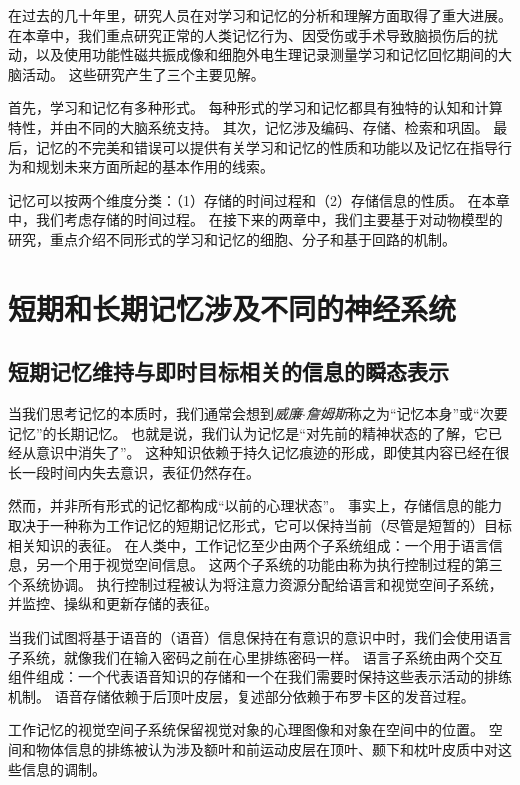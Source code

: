 在过去的几十年里，研究人员在对学习和记忆的分析和理解方面取得了重大进展。
在本章中，我们重点研究正常的人类记忆行为、因受伤或手术导致脑损伤后的扰动，以及使用功能性磁共振成像和细胞外电生理记录测量学习和记忆回忆期间的大脑活动。
这些研究产生了三个主要见解。


首先，学习和记忆有多种形式。
每种形式的学习和记忆都具有独特的认知和计算特性，并由不同的大脑系统支持。
其次，记忆涉及编码、存储、检索和巩固。
最后，记忆的不完美和错误可以提供有关学习和记忆的性质和功能以及记忆在指导行为和规划未来方面所起的基本作用的线索。


记忆可以按两个维度分类：（1）存储的时间过程和（2）存储信息的性质。
在本章中，我们考虑存储的时间过程。
在接下来的两章中，我们主要基于对动物模型的研究，重点介绍不同形式的学习和记忆的细胞、分子和基于回路的机制。



\section{短期和长期记忆涉及不同的神经系统}

\subsection{短期记忆维持与即时目标相关的信息的瞬态表示}

当我们思考记忆的本质时，我们通常会想到\textit{威廉$\cdot$詹姆斯}称之为“记忆本身”或“次要记忆”的长期记忆。
也就是说，我们认为记忆是“对先前的精神状态的了解，它已经从意识中消失了”。
这种知识依赖于持久记忆痕迹的形成，即使其内容已经在很长一段时间内失去意识，表征仍然存在。


然而，并非所有形式的记忆都构成“以前的心理状态”。
事实上，存储信息的能力取决于一种称为工作记忆的短期记忆形式，它可以保持当前（尽管是短暂的）目标相关知识的表征。
在人类中，工作记忆至少由两个子系统组成：一个用于语言信息，另一个用于视觉空间信息。
这两个子系统的功能由称为执行控制过程的第三个系统协调。
执行控制过程被认为将注意力资源分配给语言和视觉空间子系统，并监控、操纵和更新存储的表征。


当我们试图将基于语音的（语音）信息保持在有意识的意识中时，我们会使用语言子系统，就像我们在输入密码之前在心里排练密码一样。
语言子系统由两个交互组件组成：一个代表语音知识的存储和一个在我们需要时保持这些表示活动的排练机制。
语音存储依赖于后顶叶皮层，复述部分依赖于布罗卡区的发音过程。


工作记忆的视觉空间子系统保留视觉对象的心理图像和对象在空间中的位置。
空间和物体信息的排练被认为涉及额叶和前运动皮层在顶叶、颞下和枕叶皮质中对这些信息的调制。


